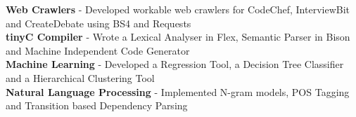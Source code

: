 \documentclass[10pt]{article}
\begin{document}
\vspace{-2.2ex}
\spacedhrule{0.15ex}{1.0ex}
\begin{indentsection}
    \smaller\href{https://github.com/shmundhra?tab=repositories}     {\faGithub}\hspace{0.5ex}\normalsize \textbf{Web Crawlers} {\hfill}{- Developed workable web crawlers for CodeChef, InterviewBit and CreateDebate using BS4 and Requests}
    \\[0.05em] \smaller\href{https://github.com/shmundhra/tinyC-Compiler}     {\faGithub}\hspace{0.5ex}\normalsize \textbf{tinyC Compiler} {\hfill}{- Wrote a Lexical Analyser in Flex, Semantic Parser in Bison and Machine Independent Code Generator}
    \\[0.05em] \smaller\href{https://github.com/shmundhra/Machine-Learning} {\faGithub}\hspace{0.5ex}\normalsize \textbf{Machine Learning} {\hfill}{- Developed a Regression Tool, a Decision Tree Classifier and a Hierarchical Clustering Tool}
    \\[0.05em] \smaller\href{https://github.com/shmundhra/Natural-Language-Processing} {\faGithub}\hspace{0.5ex}\normalsize \textbf{Natural Language Processing} {\hfill}{- Implemented N-gram models, POS Tagging and Transition based Dependency Parsing} 
\end{indentsection}
\end{document}
